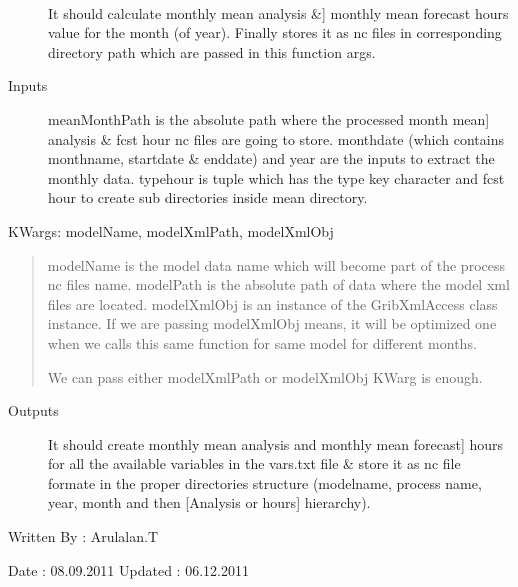 \documentclass[letterpaper,10pt,english]{sphinxmanual}
\begin{document}
\begin{fulllineitems}
\label{diagnosis:compute_month_mean.genMonthMeanFiles}~\begin{description}
\item[{}] \leavevmode{[}It should calculate monthly mean analysis \&{]}
monthly mean forecast hours value for the month (of year). Finally
stores it as nc files in corresponding directory path which are
passed in this function args.

\item[{Inputs}] \leavevmode{[}meanMonthPath is the absolute path where the processed month mean{]}
analysis \& fcst hour nc files are going to store.
monthdate (which contains monthname, startdate \& enddate) and
year are the inputs to extract the monthly data.
typehour is tuple which has the type key character and fcst hour
to create sub directories inside mean directory.

\end{description}

KWargs: modelName, modelXmlPath, modelXmlObj
\begin{quote}

modelName is the model data name which will become part of the
process nc files name.
modelPath is the absolute path of data where the model xml files
are located.
modelXmlObj is an instance of the GribXmlAccess class instance.
If we are passing modelXmlObj means, it will be optimized one
when we calls this same function for same model for different
months.

We can pass either modelXmlPath or modelXmlObj KWarg is enough.
\end{quote}
\begin{description}
\item[{Outputs}] \leavevmode{[}It should create monthly mean analysis and monthly mean forecast{]}
hours for all the available variables in the vars.txt file \&
store it as nc file formate in the proper directories structure
(modelname, process name, year, month and then
{[}Analysis or hours{]} hierarchy).

\end{description}

Written By : Arulalan.T

Date : 08.09.2011
Updated : 06.12.2011

\end{fulllineitems}
\end{document}
